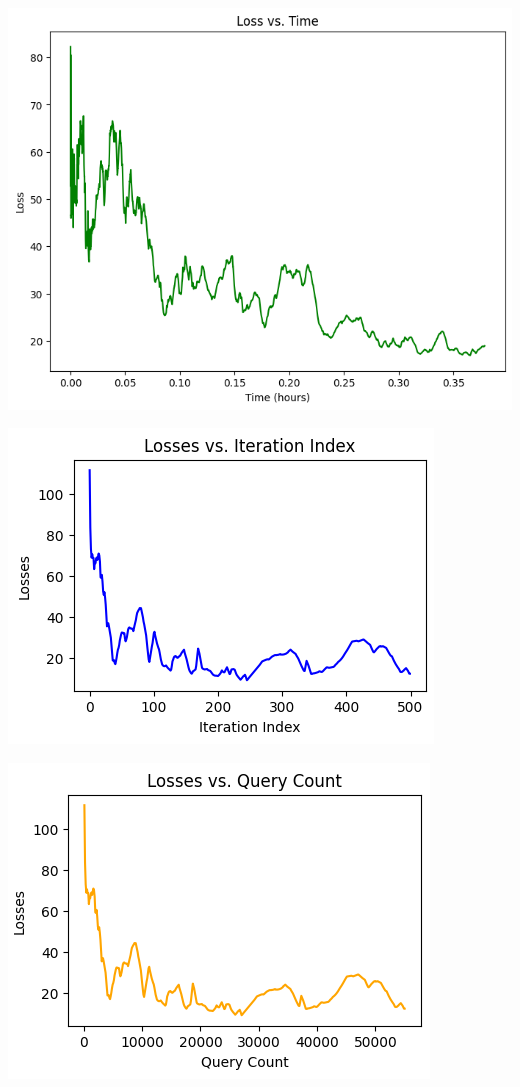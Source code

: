 \documentclass[10pt,twocolumn,letterpaper]{article}
\begin{document}
\begin{center}
   \includegraphics*[scale=0.40]{img/RDSA_loss_vs_time.png}
\end{center}

\begin{center}
   \includegraphics*[scale=0.7]{img/I-RDSA_loss_iterations.png}
\end{center}

\begin{center}
   \includegraphics*[scale=0.7]{img/I-RDSA_loss_query_count.png}
\end{center}
\end{document}
